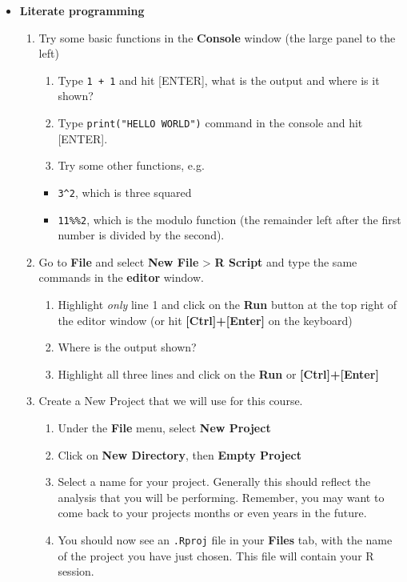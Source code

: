 \documentclass[a4paper]{book}
\providecommand{\tightlist}{%
  \setlength{\itemsep}{0pt}\setlength{\parskip}{0pt}}
\newenvironment{rmdblock}[1]
  {\vspace{1.5em}\begin{shaded*}
  \begin{itemize}
  \renewcommand{\labelitemi}{
    \raisebox{-.7\height}[0pt][0pt]{
      {\setkeys{Gin}{width=3em,keepaspectratio}\texttt{[image: images/\#1]}}
    }
  }
  \item
  }
  {
  \end{itemize}
  \end{shaded*}
  }
\newenvironment{rmdexercise}
  {\begin{rmdblock}{exercise}}
  {\end{rmdblock}}
\begin{document}
\begin{rmdexercise}
\textbf{Literate programming}

\begin{enumerate}
\def\labelenumi{\arabic{enumi}.}
\item
  Try some basic functions in the \textbf{Console} window (the large
  panel to the left)

  \begin{enumerate}
  \def\labelenumii{\alph{enumii})}
  \tightlist
  \item
    Type \texttt{1\ +\ 1} and hit {[}ENTER{]}, what is the output and
    where is it shown?
  \item
    Type \texttt{print("HELLO\ WORLD")} command in the console and hit
    {[}ENTER{]}.
  \item
    Try some other functions, e.g.
  \end{enumerate}

  \begin{itemize}
  \tightlist
  \item
    \texttt{3\^{}2}, which is three squared
  \item
    \texttt{11\%\%2}, which is the modulo function (the remainder left
    after the first number is divided by the second).
  \end{itemize}
\item
  Go to \textbf{File} and select \textbf{New File} \textgreater{}
  \textbf{R Script} and type the same commands in the \textbf{editor}
  window.

  \begin{enumerate}
  \def\labelenumii{\alph{enumii})}
  \tightlist
  \item
    Highlight \emph{only} line 1 and click on the \textbf{Run} button at
    the top right of the editor window (or hit
    \textbf{{[}Ctrl{]}+{[}Enter{]}} on the keyboard)
  \item
    Where is the output shown?
  \item
    Highlight all three lines and click on the \textbf{Run} or
    \textbf{{[}Ctrl{]}+{[}Enter{]}}
  \end{enumerate}
\item
  Create a New Project that we will use for this course.

  \begin{enumerate}
  \def\labelenumii{\alph{enumii})}
  \tightlist
  \item
    Under the \textbf{File} menu, select \textbf{New Project}
  \item
    Click on \textbf{New Directory}, then \textbf{Empty Project}
  \item
    Select a name for your project. Generally this should reflect the
    analysis that you will be performing. Remember, you may want to come
    back to your projects months or even years in the future.
  \item
    You should now see an \texttt{.Rproj} file in your \textbf{Files}
    tab, with the name of the project you have just chosen. This file
    will contain your R session.
  \end{enumerate}
\end{enumerate}
\end{rmdexercise}
\end{document}

